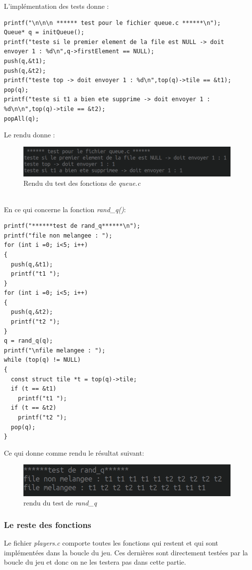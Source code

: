 \documentclass[12pt,a4paper]{extarticle}
\begin{document}
    L'impl\'ementation des tests donne :
    \begin{lstlisting}[style=CStyle]
printf("\n\n\n ****** test pour le fichier queue.c ******\n");
Queue* q = initQueue();
printf("teste si le premier element de la file est NULL -> doit envoyer 1 : %d\n",q->firstElement == NULL);
push(q,&t1);
push(q,&t2);
printf("teste top -> doit envoyer 1 : %d\n",top(q)->tile == &t1);
pop(q);
printf("teste si t1 a bien ete supprime -> doit envoyer 1 : %d\n\n",top(q)->tile == &t2);
popAll(q); \end{lstlisting}
    Le rendu donne : 
    \begin{figure}[h!]
        \centering
        \includegraphics[width=15cm]{img/queue1c}
        \caption{Rendu du test des fonctions de \emph{queue.c}}
    \end{figure}
    \\
En ce qui concerne la fonction \emph{rand\_q()}:

\begin{lstlisting}[style=CStyle]
printf("******test de rand_q******\n");
printf("file non melangee : ");
for (int i =0; i<5; i++)
{
  push(q,&t1);
  printf("t1 ");
}
for (int i =0; i<5; i++)
{
  push(q,&t2);
  printf("t2 ");
}
q = rand_q(q);
printf("\nfile melangee : ");
while (top(q) != NULL)
{
  const struct tile *t = top(q)->tile;
  if (t == &t1)
    printf("t1 ");
  if (t == &t2)
    printf("t2 ");
  pop(q);
}    \end{lstlisting}
    Ce qui donne comme rendu le r\'esultat suivant:
    \begin{figure}[h!]
        \centering
        \includegraphics[width=15cm]{img/rand_q}
        \caption{rendu du test de \emph{rand\_q}}
    \end{figure}

    \subsubsection{Le reste des fonctions}
    Le fichier \emph{players.c} comporte toutes les fonctions qui restent et qui sont impl\'ement\'ees dans la boucle
    du jeu. Ces derni\`eres sont directement test\'ees par la boucle du jeu et donc on ne les testera pas dans cette partie.
\end{document}
